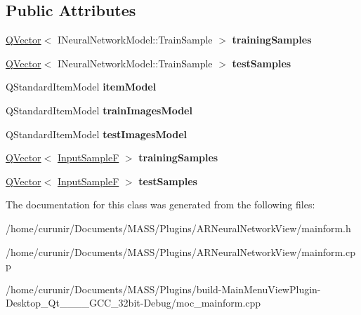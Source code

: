 \subsection*{Public Attributes}
\begin{DoxyCompactItemize}
\item 
\hyperlink{class_q_vector}{Q\+Vector}$<$ I\+Neural\+Network\+Model\+::\+Train\+Sample $>$ {\bfseries training\+Samples}\hypertarget{class_main_form_ae3827327ab01288622f789ffd9a061d9}{}\label{class_main_form_ae3827327ab01288622f789ffd9a061d9}

\item 
\hyperlink{class_q_vector}{Q\+Vector}$<$ I\+Neural\+Network\+Model\+::\+Train\+Sample $>$ {\bfseries test\+Samples}\hypertarget{class_main_form_a869b2038409b2ba9fad616af593a97a3}{}\label{class_main_form_a869b2038409b2ba9fad616af593a97a3}

\item 
Q\+Standard\+Item\+Model {\bfseries item\+Model}\hypertarget{class_main_form_a7786cdf045d6037668f86b6db1277ba3}{}\label{class_main_form_a7786cdf045d6037668f86b6db1277ba3}

\item 
Q\+Standard\+Item\+Model {\bfseries train\+Images\+Model}\hypertarget{class_main_form_af5cdf86f72c4e89d8038b1594078b2a3}{}\label{class_main_form_af5cdf86f72c4e89d8038b1594078b2a3}

\item 
Q\+Standard\+Item\+Model {\bfseries test\+Images\+Model}\hypertarget{class_main_form_afcb8254310b51c1fd58c3852a6f063fa}{}\label{class_main_form_afcb8254310b51c1fd58c3852a6f063fa}

\item 
\hyperlink{class_q_vector}{Q\+Vector}$<$ \hyperlink{class_q_pair}{Input\+SampleF} $>$ {\bfseries training\+Samples}\hypertarget{class_main_form_a52b405f679729e32653e468a14aec648}{}\label{class_main_form_a52b405f679729e32653e468a14aec648}

\item 
\hyperlink{class_q_vector}{Q\+Vector}$<$ \hyperlink{class_q_pair}{Input\+SampleF} $>$ {\bfseries test\+Samples}\hypertarget{class_main_form_a04762603238b7eace528239e5354a632}{}\label{class_main_form_a04762603238b7eace528239e5354a632}

\end{DoxyCompactItemize}


The documentation for this class was generated from the following files\+:\begin{DoxyCompactItemize}
\item 
/home/curunir/\+Documents/\+M\+A\+S\+S/\+Plugins/\+A\+R\+Neural\+Network\+View/mainform.\+h\item 
/home/curunir/\+Documents/\+M\+A\+S\+S/\+Plugins/\+A\+R\+Neural\+Network\+View/mainform.\+cpp\item 
/home/curunir/\+Documents/\+M\+A\+S\+S/\+Plugins/build-\/\+Main\+Menu\+View\+Plugin-\/\+Desktop\+\_\+\+Qt\+\_\+\_\+\_\+\_\+\+G\+C\+C\+\_\+32bit-\/\+Debug/moc\+\_\+mainform.\+cpp\end{DoxyCompactItemize}
